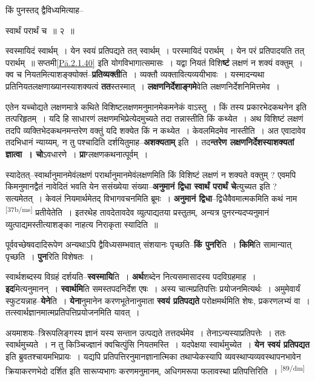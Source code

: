 \documentclass[article,12pt,a4paper]{memoir}
\begin{document}
	किं पुनस्तद् द्वैविध्यमित्याह-- 
	  
	स्वार्थं परार्थं च ॥ २ ॥ 
	  
	स्वस्मायिदं स्वार्थम् । येन स्वयं प्रतिपद्यते तत् स्वार्थम् । परस्मायिदं परार्थम् । येन परं प्रतिपादयति तत् परार्थम् ॥ सप्तमी\cref{Pā.2.1.40} इति योगविभागात्समासः । यद्वा नियतं विशि\textbf{ष्टं} लक्षणं न शक्यं वक्तुम् । क्व च नियतमित्याशङ्क्योक्तं--\textbf{प्रतिव्यक्ती}ति । व्यक्तौ व्यक्तावित्यव्ययीभावः । यस्मादन्यथा प्रतिनियतलक्षणाख्यानस्याशक्यत्वं \textbf{तत}स्तस्मात् । \textbf{लक्षणनिर्देशाङ्गमे}वेति लक्षणनिर्देशनिमित्तमेव ।
	\pend
      

	  \pstart एतेन यच्चोद्यते लक्षणमात्रे कथिते विशिष्टलक्षणमनुमानमेकमनेकं वाऽस्तु । किं तस्य प्रकारभेदकथनेन इति तत्परिहृतम् । यदि हि साधारणं लक्षणमभिप्रेत्येदमुच्यते तदा तन्नास्तीति किं कथ्येत । अथ विशिष्टं लक्षणं तदपि व्यक्तिभेदकथनमन्तरेण वक्तुं यदि शक्येत किं न कथ्येत । केवलमिदमेव नास्तीति । अत एवादावेव तदभिधानं न्याय्यम्, न तु पश्चादिति दर्शयितुमाह--\textbf{अशक्यताम्} इति । तद\textbf{न्तरेण लक्षणनिर्देशस्याशक्यतां ज्ञात्वा । चो}ऽवधारणे । \textbf{प्रा}ग्लक्षणकथनात्पूर्वम् ।
	\pend
      

	  \pstart स्यादेतत्--स्वार्थानुमानमेवंलक्षणं परार्थानुमानमेवंलक्षणमिति किं विशिष्टं लक्षणं न शक्यते वक्तुम् ? एवमपि किमनुमानद्वैतं नावेदितं भवति येन ससंख्येया संख्या--\textbf{अनुमानं द्विधा स्वार्थं परार्थं चे}त्युच्यत इति ? सत्यमेतत् । केवलं नियमार्थमेतद् विभागवचनमिति ब्रूमः । \textbf{अनुमानं द्विधा}--द्विधैवैवमात्मकमिति कथं नाम \leavevmode\textsuperscript{\rmlatinfont\tiny [37b/ms]} प्रतीयेतेति । इतरथेह तावदेतावदेव व्युत्पाद्यतया प्रस्तुतम्, अन्यत्र पुनरन्यदप्यनुमानं व्युत्पाद्यमस्तीत्याशङ्का नाहत्य निराकृता स्यादिति ॥
	\pend
      

	  \pstart पूर्ववच्छेषवदादिरूपेण अन्यथाऽपि द्वैविध्यसम्भवात् संशयानः पृच्छति--\textbf{किं पुनरि}ति । \textbf{किमि}ति सामान्यात् पृच्छति । \textbf{पुन}रिति विशेषतः ।
	\pend
      

	  \pstart स्वार्थशब्दस्य विग्रहं दर्शयति--\textbf{स्वस्मायि}ति । \textbf{अर्थ}शब्देन नित्यसमासादस्य पदविग्रहमाह । \textbf{इद}मित्यनुमानन् । \textbf{स्वार्थमि}ति समस्तपदनिर्देश एषः । अस्य चात्मप्रतिपत्तिः प्रयोजनमित्यर्थः । अमुमेवार्यं स्फुटयन्नाह--\textbf{येने}ति । \textbf{येना}नुमानेन करणभूतेनानुमाता \textbf{स्वयं प्रतिपद्यते} परोक्षमर्थमिति शेषः, प्रकरणलभ्यं वा । तत्स्वार्थज्ञानमात्मप्रतिपत्तिप्रयोजनमिति यावत् ।
	\pend
      

	  \pstart अयमाशयः--त्रिरूपलिङ्गस्य ज्ञानं यस्य सन्तान उत्पद्यते तत्तदर्थमेव । तेनाऽन्यस्याप्रतिपत्तेः । ततः स्वार्थमुच्यते । न तु किञ्चिज्ज्ञानं क्वचित्पुंसि नियतमस्ति । यदपेक्षया स्वार्थमुच्येत । \textbf{येन स्वयं प्रतिपद्यत} इति ब्रुवतश्चायमभिप्रायः । यद्यपि प्रतिपत्तिरनुमानज्ञानात्मिका तथाप्येकस्यापि व्यवस्थाप्यव्यवस्थापनभावेन क्रियाकरणभेदो दर्शित इति सारूप्यभागः करणमनुमानम्, अधिगमरूपा फलावस्था प्रतिपत्तिरिति ।
	\pend
      \leavevmode\textsuperscript{\rmlatinfont\tiny [89/dm]}
\end{document}
